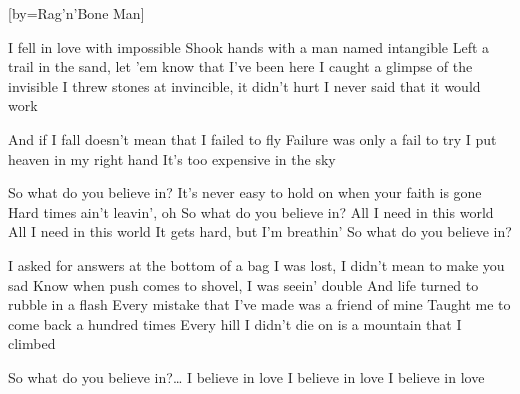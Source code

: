 


[by=Rag'n'Bone Man]

\beginverse*
{\nolyrics Jam chart: \[Em] \[G] \[Bm] \[Bm] \quad (Loop)}
\endverse

\beginverse
I fell in love with impossible \brk  Shook hands with a man named intangible
Left a trail in the sand, let 'em know that I've been here
I caught a glimpse of the invisible \brk  I threw stones at invincible, it didn't hurt
I never said that it would work
\endverse

\beginverse
And if I fall doesn't mean that I failed to fly \brk  Failure was only a fail to try
I put heaven in my right hand \brk  It's too expensive in the sky
\endverse

\beginchorus
So what do you believe in? \brk  It's never easy to hold on when your faith is gone
Hard times ain't leavin', oh \brk  So what do you believe in?
All I need in this world \brk  All I need in this world
It gets hard, but I'm breathin'
So what do you believe in?
\endchorus

\beginverse
I asked for answers at the bottom of a bag \brk  I was lost, I didn't mean to make you sad
Know when push comes to shovel, I was seein' double \brk  And life turned to rubble in a flash
Every mistake that I've made was a friend of mine \brk  Taught me to come back a hundred times
Every hill I didn't die on is a mountain that I climbed
\endverse

\beginchorus
{} So what do you believe in?\ldots
I believe in love \brk  I believe in love \brk  I believe in love
\endchorus

\endsong
